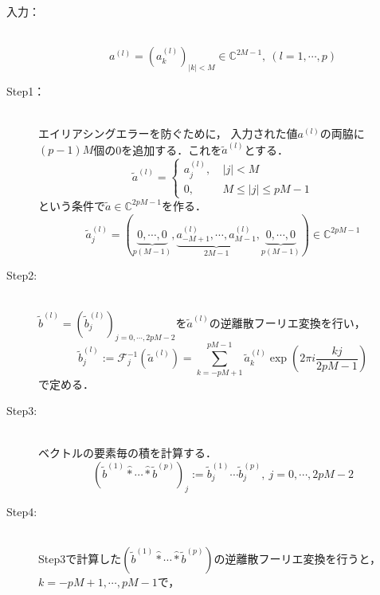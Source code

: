 \documentclass[11pt,a4paper,titlepage]{jsreport}
\theoremstyle{definition}
\begin{document}
\begin{description}
  \item[入力：]
    \quad \\
    \begin{equation*}
      a^{(l)} = \left( a_k^{(l)} \right)_{|k|<M}\in\mathbb{C}^{2M-1},\ (l=1,\cdots,p)
    \end{equation*}
  \item[Step1：]
    \quad \\
    エイリアシングエラーを防ぐために， 入力された値$a^{(l)}$の両脇に$(p-1)M$個の0を追加する．これを$\tilde{a}^{(l)}$とする．
    \begin{equation*}
      \tilde{a}^{(l)} = \begin{cases}
        a_j^{(l)} ,\  & |j|<M               \\
        0,\           & M\leq |j| \leq pM-1
      \end{cases}
    \end{equation*}
    という条件で$\tilde{a} \in \mathbb{C}^{2pM-1}$を作る．
    \begin{equation*}
      \tilde{a}_j^{(l)} = ( \underbrace{0,\cdots,0}_{p(M-1)},\underbrace{a_{-M+1}^{(l)},\cdots,a_{M-1}^{(l)}}_{2M-1},\underbrace{0,\cdots,0}_{p(M-1)} ) \in \mathbb{C}^{2pM-1}
    \end{equation*}
  \item[Step2:]
    \quad \\
    $\tilde{b}^{(l)} = \left( \tilde{b}_j^{(l)} \right)_{j=0,\cdots,2pM-2}$を$\tilde{a}^{(l)}$の逆離散フーリエ変換を行い，
    \begin{equation*}
      \tilde{b}_j^{(l)} := \mathcal{F}_j^{-1} \left( \tilde{a}^{(l)} \right) = \sum_{k=-pM+1}^{pM-1} \tilde{a}_k^{(l)} \exp\left(2\pi i \frac{kj}{2pM-1}\right)
    \end{equation*}
    で定める．
  \item[Step3:]
    \quad \\
    ベクトルの要素毎の積を計算する．
    \begin{equation*}
      \left( \tilde{b}^{(1)} \hat{*} \cdots \hat{*} \tilde{b}^{(p)} \right)_j := \tilde{b}_j^{(1)} \cdots \tilde{b}_j^{(p)},\ j=0,\cdots,2pM-2
    \end{equation*}
  \item[Step4:]
    \quad \\
    Step3で計算した$\left( \tilde{b}^{(1)} \hat{*} \cdots \hat{*} \tilde{b}^{(p)} \right)$の逆離散フーリエ変換を行うと，$k=-pM+1,\cdots,pM-1$で，
    \begin{align*}

\end{align*}
\end{description}
\end{document}
